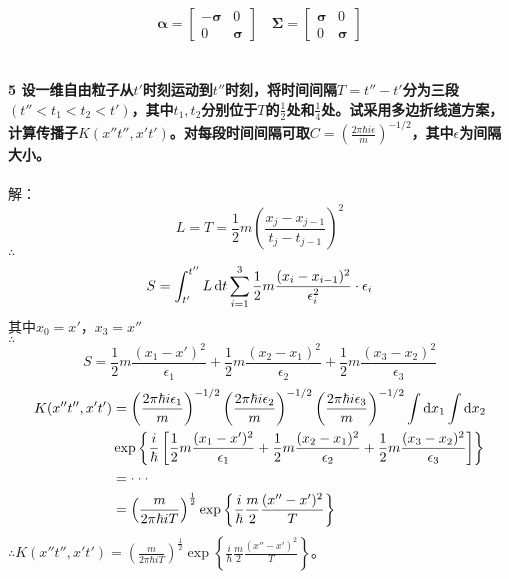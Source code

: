 \documentclass[12pt]{article}
\numberwithin{equation}{section}	 %
\begin{document}
\begin{spacing}{1.5}
\begin{equation}
\bm\alpha = \begin{bmatrix} -\bm\sigma & 0 \\ 0 & \bm\sigma \end{bmatrix} \quad \bm\Sigma = \begin{bmatrix} \bm\sigma & 0 \\ 0 & \bm\sigma \end{bmatrix}
\end{equation}
~\\
~\\
\textbf{5 \quad 设一维自由粒子从$t'$时刻运动到$t''$时刻，将时间间隔$T=t''-t'$分为三段$(t''<t_{1}<t_{2}<t')$，其中$t_{1},t_{2}$分别位于$T$的$\displaystyle \frac{1}{2}$处和$\displaystyle \frac{1}{4}$处。试采用多边折线道方案，计算传播子$K(x''t'',x't')$。对每段时间间隔可取$\displaystyle C=\left(\frac{2\pi\hbar i\epsilon}{m}\right)^{-1/2}$，其中$\epsilon$为间隔大小。}\\
~\\
解：
\begin{equation}\nonumber 		%
L=T=\frac{1}{2}m\left(\frac{x_{j}-x_{j-1}}{t_{j}-t_{j-1}}\right)^{2}
\end{equation}
$\therefore$
\begin{equation}\nonumber 		%
S=\int^{t''}_{t'}L\dif t \sum_{i=1}^{3}\frac{1}{2}m\frac{(x_{i}-x_{i-1})^{2}}{\epsilon_{i}^{2}}\cdot\epsilon_{i}
\end{equation}
其中$x_{0}=x'$，$x_{3}=x''$\\
$\therefore$
\begin{equation}
S=\frac{1}{2}m\frac{(x_{1}-x')^{2}}{\epsilon_{1}} + \frac{1}{2}m\frac{(x_{2}-x_{1})^{2}}{\epsilon_{2}} + \frac{1}{2}m\frac{(x_{3}-x_{2})^{2}}{\epsilon_{3}}
\end{equation}
\begin{align*}
K(x''t'',x't') &= \left(\frac{2\pi\hbar i\epsilon_{1}}{m}\right)^{-1/2}\left(\frac{2\pi\hbar i\epsilon_{2}}{m}\right)^{-1/2}\left(\frac{2\pi\hbar i\epsilon_{3}}{m}\right)^{-1/2} \int\mathop{}\!\mathrm{d} x_{1}\int\mathop{}\!\mathrm{d} x_{2} \\ & \exp\left\{\frac{i}{\hbar}\left[ \frac{1}{2}m\frac{(x_{1}-x')^{2}}{\epsilon_{1}} + \frac{1}{2}m\frac{(x_{2}-x_{1})^{2}}{\epsilon_{2}} + \frac{1}{2}m\frac{(x_{3}-x_{2})^{2}}{\epsilon_{3}} \right] \right\} \\
&= \cdot\cdot\cdot \\
&= \left(\frac{m}{2\pi\hbar iT}\right)^{\frac{1}{2}}\exp\left\{ \frac{i}{\hbar} \frac{m}{2} \frac{(x''-x')^{2}}{T} \right\}
\end{align*}
$\therefore \displaystyle K(x''t'',x't') = \left(\frac{m}{2\pi\hbar iT}\right)^{\frac{1}{2}}\exp\left\{ \frac{i}{\hbar} \frac{m}{2} \frac{(x''-x')^{2}}{T} \right\}$。
~\\
~\\


\end{spacing}
\end{document}
